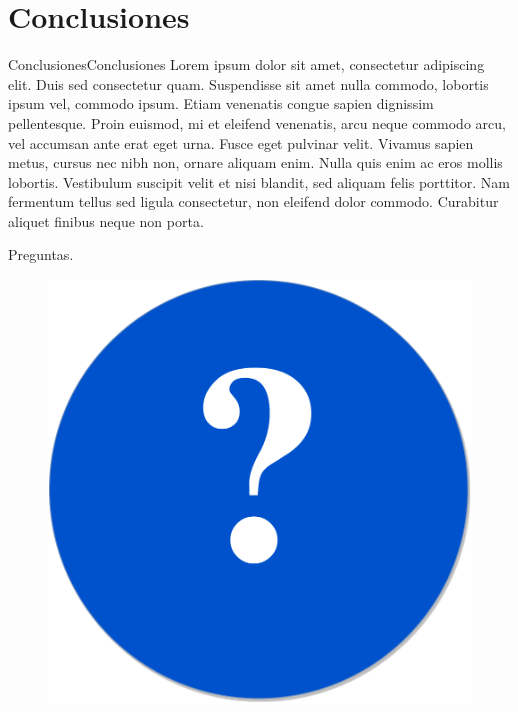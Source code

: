 \documentclass{beamer}
\begin{document}
\section{Conclusiones}

\begin{frame}{Conclusiones}{Conclusiones}
Lorem ipsum dolor sit amet, consectetur adipiscing elit. Duis sed consectetur quam. Suspendisse sit amet nulla commodo, lobortis ipsum vel, commodo ipsum. Etiam venenatis congue sapien dignissim pellentesque. Proin euismod, mi et eleifend venenatis, arcu neque commodo arcu, vel accumsan ante erat eget urna. Fusce eget pulvinar velit. Vivamus sapien metus, cursus nec nibh non, ornare aliquam enim. Nulla quis enim ac eros mollis lobortis. Vestibulum suscipit velit et nisi blandit, sed aliquam felis porttitor. Nam fermentum tellus sed ligula consectetur, non eleifend dolor commodo. Curabitur aliquet finibus neque non porta. 
\end{frame}

\begin{frame}{Preguntas}{\textcolor{UniBlue}{.}}
\begin{figure}
  \center
    \includegraphics[scale=0.25]{images/Questions.pdf}
\end{figure}
\end{frame}
\end{document}
